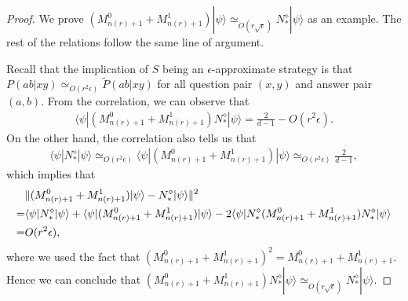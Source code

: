 \documentclass[11pt,letterpaper]{article}
\newcommand{\ket}[1]{|#1\rangle}
\newcommand{\bra}[1]{\langle#1|}
\DeclarePairedDelimiter{\norm}{\lVert}{\rVert}
\newcommand{\1}{\mathbb{1}}
\newcommand{\nr}{n(r)}
\newcommand{\pr}[2]{P(#1|#2)}
\newcommand{\tpr}[2]{\tilde{P}(#1|#2)}
\newcommand{\ep}{\epsilon}
\newcommand{\se}{\sqrt{\epsilon}}
\newcommand{\appd}[1]{\simeq_{#1}}
\theoremstyle{definition}
\begin{document}
\begin{proof} 
We prove $(M_{\nr+1}^0+M_{\nr+1}^1)\ket{\psi} \appd{O(r\se)} N_\ast^\diamond \ket{\psi}$ as an example.
The rest of the relations follow the same line of argument.

Recall that the implication of $S$ being an $\ep$-approximate strategy is that 
$\pr{ab}{xy} \appd{O(r^2\ep)} \tpr{ab}{xy}$ for all question 
pair $(x,y)$ and answer pair $(a,b)$.
From the correlation, we can observe that
\begin{align*}
 \bra{\psi} (M_{\nr+1}^0+M_{\nr+1}^1)N_\ast^\diamond \ket{\psi} = \frac{2}{d-1} - O(r^2 \epsilon).
\end{align*}
On the other hand, the correlation also tells us that 
\begin{align*}
	\bra{\psi} N_\ast^\diamond \ket{\psi} \appd{O(r^2\epsilon)} 
 \bra{\psi}(M_{\nr+1}^0+M_{\nr+1}^1)\ket{\psi} \appd{O(r^2\epsilon)} \frac{2}{d-1},
\end{align*}
which implies that 
\begin{align*}
	&\norm{(M_{\nr+1}^0 + M_{\nr+1}^1) \ket{\psi} - N_\ast^\diamond\ket{\psi}}^2 \\
	= &\bra{\psi} N_\ast^\diamond \ket{\psi}+\bra{\psi}(M_{\nr+1}^0+M_{\nr+1}^1)\ket{\psi} - 2\bra{\psi}N_\ast^\diamond(M_{\nr+1}^0 + M_{\nr+1}^1)N_\ast^\diamond \ket{\psi}\\
	= &O(r^2 \epsilon),
\end{align*}
where we used the fact that $(M_{\nr+1}^0 + M_{\nr+1}^1)^2 = M_{\nr+1}^0 + M_{\nr+1}^1$.
Hence we can conclude that $(M_{\nr+1}^0 + M_{\nr+1}^1)N_\ast^\diamond \ket{\psi} \appd{O(r\se)} N_\ast^\diamond\ket{\psi}$.
\end{proof}
\end{document}
